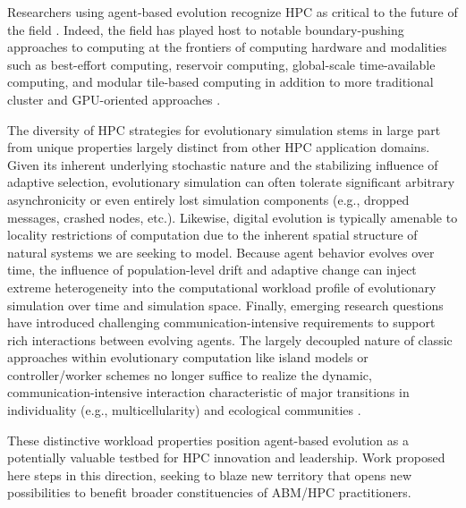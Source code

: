 Researchers using agent-based evolution recognize HPC as critical to the future of the field \citep{ackley2016indefinite}.
Indeed, the field has played host to notable boundary-pushing approaches to computing at the frontiers of computing hardware and modalities such as best-effort computing, reservoir computing, global-scale time-available computing, and modular tile-based computing in addition to more traditional cluster and GPU-oriented approaches \citep{moreno2021conduit,ackley2020best,ackley2023robust,heinemann2008artificial,miikkulainen2024evolving}.

The diversity of HPC strategies for evolutionary simulation stems in large part from unique properties largely distinct from other HPC application domains.
Given its inherent underlying stochastic nature and the stabilizing influence of adaptive selection, evolutionary simulation can often tolerate significant arbitrary asynchronicity or even entirely lost simulation components (e.g., dropped messages, crashed nodes, etc.).
Likewise, digital evolution is typically amenable to locality restrictions of computation due to the inherent spatial structure of natural systems we are seeking to model.
Because agent behavior evolves over time, the influence of population-level drift and adaptive change can inject extreme heterogeneity into the computational workload profile of evolutionary simulation over time and simulation space.
Finally, emerging research questions have introduced challenging communication-intensive requirements to support rich interactions between evolving agents.
The largely decoupled nature of classic approaches within evolutionary computation like island models or controller/worker schemes  \citep{bennett1999building,cantu2001master} no longer suffice to realize the dynamic, communication-intensive interaction characteristic of major transitions in individuality (e.g., multicellularity) and ecological communities \citep{moreno2022engineering}.

These distinctive workload properties position agent-based evolution as a potentially valuable testbed for HPC innovation and leadership.
Work proposed here steps in this direction, seeking to blaze new territory that opens new possibilities to benefit broader constituencies of ABM/HPC practitioners.

